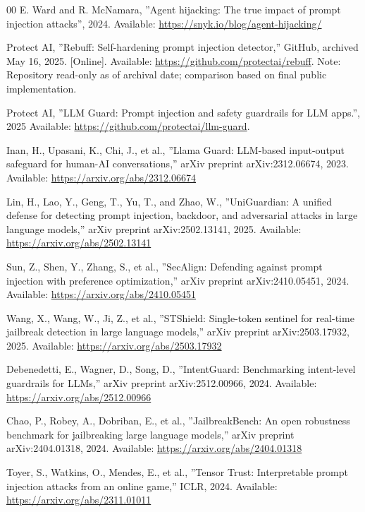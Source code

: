 \documentclass[manuscript,screen,review]{acmart}
\begin{document}
\begin{thebibliography}{00}
 E. Ward and R. McNamara, ''Agent hijacking: The true impact of prompt injection attacks'', 2024. Available: \url{https://snyk.io/blog/agent-hijacking/}

 Protect AI, ''Rebuff: Self-hardening prompt injection detector,'' GitHub, archived May 16, 2025. [Online]. Available: \url{https://github.com/protectai/rebuff}. Note: Repository read-only as of archival date; comparison based on final public implementation.

 Protect AI, ''LLM Guard: Prompt injection and safety guardrails for LLM apps.'', 2025 Available: \url{https://github.com/protectai/llm-guard}.


 Inan, H., Upasani, K., Chi, J., et al., ''Llama Guard: LLM-based input-output safeguard for human-AI conversations,'' arXiv preprint arXiv:2312.06674, 2023. Available: \url{https://arxiv.org/abs/2312.06674}

 Lin, H., Lao, Y., Geng, T., Yu, T., and Zhao, W., ''UniGuardian: A unified defense for detecting prompt injection, backdoor, and adversarial attacks in large language models,'' arXiv preprint arXiv:2502.13141, 2025. Available: \url{https://arxiv.org/abs/2502.13141}

 Sun, Z., Shen, Y., Zhang, S., et al., ''SecAlign: Defending against prompt injection with preference optimization,'' arXiv preprint arXiv:2410.05451, 2024. Available: \url{https://arxiv.org/abs/2410.05451}

 Wang, X., Wang, W., Ji, Z., et al., ''STShield: Single-token sentinel for real-time jailbreak detection in large language models,'' arXiv preprint arXiv:2503.17932, 2025. Available: \url{https://arxiv.org/abs/2503.17932}

 Debenedetti, E., Wagner, D., Song, D., ''IntentGuard: Benchmarking intent-level guardrails for LLMs,'' arXiv preprint arXiv:2512.00966, 2024. Available: \url{https://arxiv.org/abs/2512.00966}


 Chao, P., Robey, A., Dobriban, E., et al., ''JailbreakBench: An open robustness benchmark for jailbreaking large language models,'' arXiv preprint arXiv:2404.01318, 2024. Available: \url{https://arxiv.org/abs/2404.01318}

 Toyer, S., Watkins, O., Mendes, E., et al., ''Tensor Trust: Interpretable prompt injection attacks from an online game,'' ICLR, 2024. Available: \url{https://arxiv.org/abs/2311.01011}


\end{thebibliography}
\end{document}
